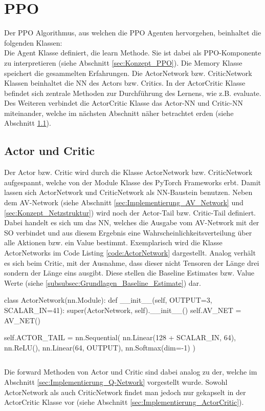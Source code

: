 \section{PPO} \label{sec:Implementierung_PPO}
Der PPO Algorithmus, aus welchen die PPO Agenten hervorgehen, beinhaltet die folgenden Klassen:\\
Die Agent Klasse definiert, die learn Methode.  Sie ist dabei als PPO-Komponente zu interpretieren (siehe Abschnitt \ref{sec:Konzept_PPO}).
Die Memory Klasse speichert die gesammelten Erfahrungen.
Die ActorNetwork bzw. CriticNetwork Klassen beinhaltet die NN des Actors bzw. Critics.
In der ActorCritic Klasse befindet sich zentrale Methoden zur Durchführung des Lernens, wie z.B. evaluate. 
Des Weiteren verbindet die ActorCritic Klasse das Actor-NN und Critic-NN miteinander, welche im nächsten Abschnitt näher betrachtet erden (siehe Abschnitt \ref{sec:Implementierung_Actor_and_Critic}).

\subsection{Actor und Critic} \label{sec:Implementierung_Actor_and_Critic}
Der Actor bzw. Critic wird durch die Klasse ActorNetwork bzw. CriticNetwork aufgespannt, welche von der Module Klasse des PyTorch Frameworks erbt. Damit lassen sich ActorNetwork und CriticNetwork als NN-Baustein benutzen.
Neben dem AV-Network (siehe Abschnitt \ref{sec:Implementierung_AV_Network} und \ref{sec:Konzept_Netzstruktur}) wird noch der Actor-Tail bzw. Critic-Tail definiert. Dabei handelt es sich um das NN, welches die Ausgabe vom AV-Network mit der SO verbindet und aus diesem Ergebnis eine Wahrscheinlichkeitsverteilung über alle Aktionen bzw. ein Value bestimmt. 
Exemplarisch wird die Klasse ActorNetworks im Code Listing \ref{code:ActorNetwork} dargestellt. Analog verhält es sich beim Critic, mit der Ausnahme, dass dieser nicht Tensoren der Länge drei sondern der Länge eins ausgibt. Diese stellen die Baseline Estimates bzw. Value Werte (siehe \ref{subsubsec:Grundlagen_Baseline_Estimate}) dar.
\begin{python}
class ActorNetwork(nn.Module):
	def __init__(self, OUTPUT=3, SCALAR_IN=41):
		super(ActorNetwork, self).__init__()
		self.AV_NET = AV_NET()
			
		self.ACTOR_TAIL = nn.Sequential(
			nn.Linear(128 + SCALAR_IN, 64),
			nn.ReLU(),
			nn.Linear(64, OUTPUT),
			nn.Softmax(dim=-1)
		)
\end{python}
\begin{lstlisting}[caption=ActorNetwork, label=code:ActorNetwork]
\end{lstlisting}
Die forward Methoden von Actor und Critic sind dabei analog zu der, welche im Abschnitt \ref{sec:Implementierung_Q-Network} vorgestellt wurde. 
Sowohl ActorNetwork als auch CriticNetwork findet man jedoch nur gekapselt in der ActorCritic Klasse vor (siehe Abschnitt \ref{sec:Implementierung_ActorCritic}).

